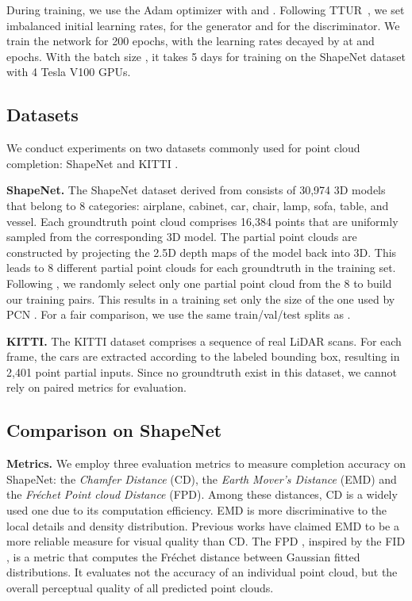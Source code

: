 \documentclass[final]{cvpr}
\begin{document}
During training, we use the Adam optimizer with  and . Following TTUR~\cite{heusel2017gans}, we set imbalanced initial learning rates,  for the generator and  for the discriminator. We train the network for 200 epochs, with the learning rates decayed by  at  and  epochs. 
With the batch size , it takes 5 days for training on the ShapeNet dataset with 4 Tesla V100 GPUs. 




\subsection{Datasets}
We conduct experiments on two datasets commonly used for point cloud completion: ShapeNet \cite{chang2015shapenet} and KITTI \cite{geiger2013vision}.

\noindent\textbf{ShapeNet.} The ShapeNet dataset derived from \cite{Yuan-2018-pcn} consists of 30,974 3D models that belong to 8 categories: airplane, cabinet, car, chair, lamp, sofa, table, and vessel. Each groundtruth point cloud comprises 16,384 points that are uniformly sampled from the corresponding 3D model. The partial point clouds are constructed by projecting the 2.5D depth maps of the model back into 3D. This leads to 8 different partial point clouds for each groundtruth in the training set.
Following \cite{xie2020grnet,cascaded_2020_CVPR}, we randomly select only one partial point cloud from the 8 to build our training pairs. 
This results in a training set only  the size of the one used by PCN \cite{Yuan-2018-pcn}.
For a fair comparison, we use the same train/val/test splits as \cite{xie2020grnet,cascaded_2020_CVPR}.


\noindent\textbf{KITTI.} The KITTI dataset comprises a sequence of real LiDAR scans. 
For each frame, the cars are extracted according to the labeled bounding box, resulting in 2,401 point partial inputs. Since no groundtruth exist in this dataset, we cannot rely on paired metrics for evaluation. 


\subsection{Comparison on ShapeNet}

\noindent\textbf{Metrics.} We employ three evaluation metrics to measure completion accuracy on ShapeNet: the \emph{Chamfer Distance} (CD), the \emph{Earth Mover's Distance} (EMD) and the \emph{Fr\'echet Point cloud Distance} (FPD).
Among these distances, CD is a widely used one due to its computation efficiency. 
EMD is more discriminative to the local details and density distribution. Previous works \cite{liu2019morphing,fan2017pointsetgeneration,achlioptas2018learning} have claimed EMD to be a more reliable measure for visual quality than CD.
The FPD \cite{shu20193d}, inspired by the FID \cite{heusel2017gans}, is a metric that computes the Fr\'echet distance between Gaussian fitted distributions. It evaluates not the accuracy of an individual point cloud, but the overall perceptual quality of all predicted point clouds. 
\end{document}
